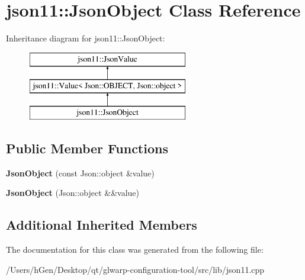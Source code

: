 \hypertarget{classjson11_1_1_json_object}{}\section{json11\+:\+:Json\+Object Class Reference}
\label{classjson11_1_1_json_object}
Inheritance diagram for json11\+:\+:Json\+Object\+:\begin{figure}[H]
\begin{center}
\leavevmode
\includegraphics[height=3.000000cm]{classjson11_1_1_json_object}
\end{center}
\end{figure}
\subsection*{Public Member Functions}
\begin{DoxyCompactItemize}
\item 
\mbox{\label{classjson11_1_1_json_object_a078da3ed9d93649f3c3a717d347ac94a}} 
{\bfseries Json\+Object} (const Json\+::object \&value)
\item 
\mbox{\label{classjson11_1_1_json_object_a22c01f3ec1b8e78bc341375c755184f2}} 
{\bfseries Json\+Object} (Json\+::object \&\&value)
\end{DoxyCompactItemize}
\subsection*{Additional Inherited Members}


The documentation for this class was generated from the following file\+:\begin{DoxyCompactItemize}
\item 
/\+Users/h\+Gen/\+Desktop/qt/glwarp-\/configuration-\/tool/src/lib/json11.\+cpp\end{DoxyCompactItemize}
